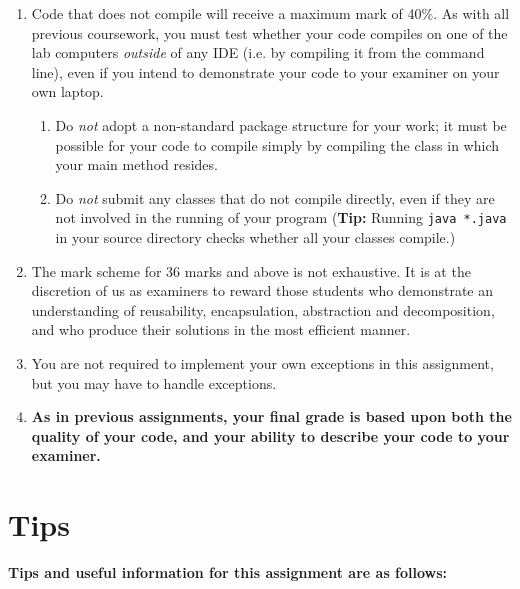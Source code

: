 \documentclass[11pt]{article}
\begin{document}
\begin{enumerate}
	
	\item Code that does not compile will receive a maximum mark of 40\%. As with all previous coursework, you must test whether your code compiles on one of the lab computers \emph{outside} of any IDE (i.e. by compiling it from the command line), even if you intend to demonstrate your code to your examiner on your own laptop. 
	
	\begin{enumerate}
	
		\item Do \emph{not} adopt a non-standard package structure for your work; it must be possible for your code to compile simply by compiling the class in which your main method resides.
	
		\item Do \emph{not} submit any classes that do not compile directly, even if they are not involved in the running of your program (\textbf{Tip:} Running \texttt{java *.java} in your source directory checks whether all your classes compile.)
	
	\end{enumerate}
	
	\item The mark scheme for 36 marks and above is not exhaustive. It is at the discretion of us as examiners to reward those students who demonstrate an understanding of reusability, encapsulation, abstraction and decomposition, and who produce their solutions in the most efficient manner.

	\item You are not required to implement your own exceptions in this assignment, but you may have to handle exceptions.
	
	\item \textbf{As in previous assignments, your final grade is based upon both the quality of your code, and your ability to describe your code to your examiner.}
		
\end{enumerate}

\section{Tips}

\textbf{Tips and useful information for this assignment are as follows:}
\end{document}
